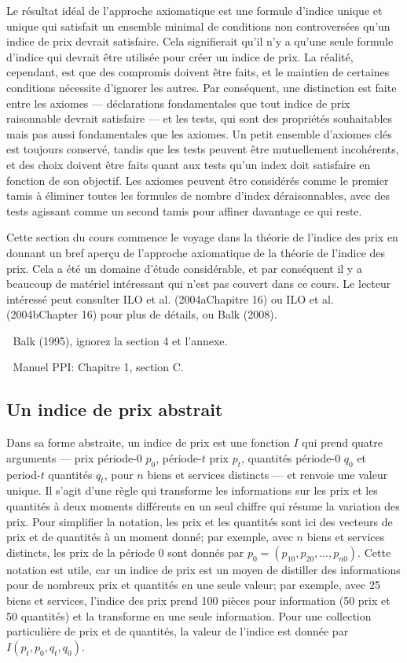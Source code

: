 \documentclass[
]{article}
\begin{document}
Le résultat idéal de l'approche axiomatique est une formule d'indice unique et unique qui satisfait un ensemble minimal de conditions non controversées qu'un indice de prix devrait satisfaire. Cela signifierait qu'il n'y a qu'une seule formule d'indice qui devrait être utilisée pour créer un indice de prix. La réalité, cependant, est que des compromis doivent être faits, et le maintien de certaines conditions nécessite d'ignorer les autres. Par conséquent, une distinction est faite entre les axiomes --- déclarations fondamentales que tout indice de prix raisonnable devrait satisfaire --- et les tests, qui sont des propriétés souhaitables mais pas aussi fondamentales que les axiomes. Un petit ensemble d'axiomes clés est toujours conservé, tandis que les tests peuvent être mutuellement incohérents, et des choix doivent être faits quant aux tests qu'un index doit satisfaire en fonction de son objectif. Les axiomes peuvent être considérés comme le premier tamis à éliminer toutes les formules de nombre d'index déraisonnables, avec des tests agissant comme un second tamis pour affiner davantage ce qui reste.

Cette section du cours commence le voyage dans la théorie de l'indice des prix en donnant un bref aperçu de l'approche axiomatique de la théorie de l'indice des prix. Cela a été un domaine d'étude considérable, et par conséquent il y a beaucoup de matériel intéressant qui n'est pas couvert dans ce cours. Le lecteur intéressé peut consulter ILO et al. (2004aChapitre 16) ou ILO et al. (2004bChapter 16) pour plus de détails, ou Balk (2008).

📖 Balk (1995), ignorez la section 4 et l'annexe.

📖 Manuel PPI: Chapitre 1, section C.

\hypertarget{un-indice-de-prix-abstrait}{%
\subsection{Un indice de prix abstrait}\label{un-indice-de-prix-abstrait}}

Dans sa forme abstraite, un indice de prix est une fonction \(I\) qui prend quatre arguments --- prix période-0 \(p_{0}\), période-\(t\) prix \(p_{t}\), quantités période-0 \(q_{0}\) et period-\(t\) quantités \(q_{t}\), pour \(n\) biens et services distincts --- et renvoie une valeur unique. Il s'agit d'une règle qui transforme les informations sur les prix et les quantités à deux moments différents en un seul chiffre qui résume la variation des prix. Pour simplifier la notation, les prix et les quantités sont ici des vecteurs de prix et de quantités à un moment donné; par exemple, avec \(n\) biens et services distincts, les prix de la période 0 sont donnés par \(p_0 = (p_{10}, p_{20}, \ldots, p_{n0})\). Cette notation est utile, car un indice de prix est un moyen de distiller des informations pour de nombreux prix et quantités en une seule valeur; par exemple, avec 25 biens et services, l'indice des prix prend 100 pièces pour information (50 prix et 50 quantités) et la transforme en une seule information. Pour une collection particulière de prix et de quantités, la valeur de l'indice est donnée par \(I(p_{t}, p_{0}, q_{t}, q_{0})\).
\end{document}
